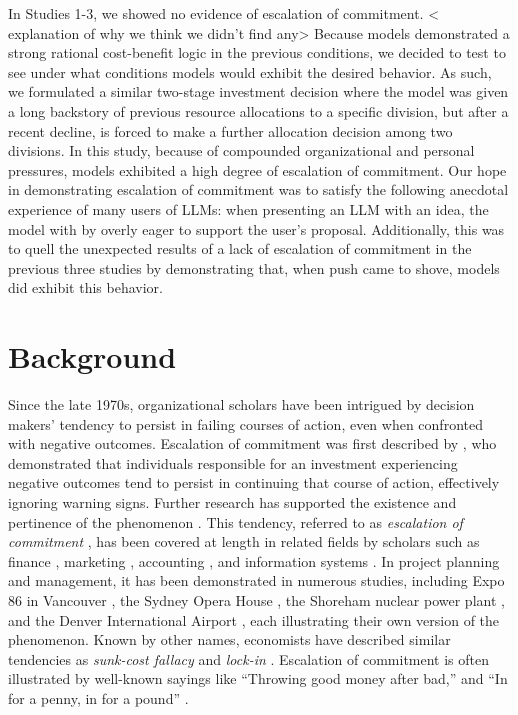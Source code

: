\documentclass[letterpaper]{article} %
\begin{document}
In Studies 1-3, we showed no evidence of escalation of commitment. < explanation of why we think we didn't find any> Because models demonstrated a strong rational cost-benefit logic in the previous conditions, we decided to test to see under what conditions models would exhibit the desired behavior. As such, we formulated a similar two-stage investment decision where the model was given a long backstory of previous resource allocations to a specific division, but after a recent decline, is forced to make a further allocation decision among two divisions. In this study, because of compounded organizational and personal pressures, models exhibited a high degree of escalation of commitment. Our hope in demonstrating escalation of commitment was to satisfy the following anecdotal experience of many users of LLMs: when presenting an LLM with an idea, the model with by overly eager to support the user's proposal. Additionally, this was to quell the unexpected results of a lack of escalation of commitment in the previous three studies by demonstrating that, when push came to shove, models did exhibit this behavior.

\section{Background}

Since the late 1970s, organizational scholars have been intrigued by decision makers’ tendency to persist in failing courses of action, even when confronted with negative outcomes. Escalation of commitment was first described by \cite{Staw-1976}, who demonstrated that individuals responsible for an investment experiencing negative outcomes tend to persist in continuing that course of action, effectively ignoring warning signs. Further research has supported the existence and pertinence of the phenomenon \cite{Brockner-1992, Shapira-1997, Sleesman-2012, Drummond-2017, Drummond-2014, Salter-2013}. This tendency, referred to as \textit{escalation of commitment} \cite{Staw-1976}, has been covered at length in related fields by scholars such as finance \cite{Schulz-Cheng-2002}, marketing \cite{Schmidt-Calantone-2002}, accounting \cite{Jeffrey-1992}, and information systems \cite{Heng-2003}. In project planning and management, it has been demonstrated in numerous studies, including Expo 86 in Vancouver \cite{Ross-1986}, the Sydney Opera House \cite{flyvbjerg-2009}, the Shoreham nuclear power plant \cite{Ross-1993}, and the Denver International Airport \cite{Montealegre-2000}, each illustrating their own version of the phenomenon. Known by other names, economists have described similar tendencies as \textit{sunk-cost fallacy} \cite{Arkes-1985, Berg-2009} and \textit{lock-in} \cite{Cantarelli-2010}. Escalation of commitment is often illustrated by well-known sayings like ``Throwing good money after bad,'' and ``In for a penny, in for a pound'' \cite{Flyvbjerg-2021}.
\end{document}
